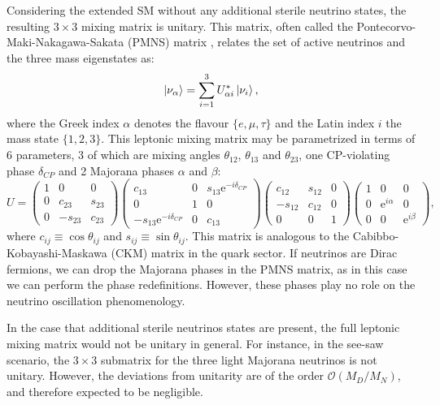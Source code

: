 Considering the extended SM without any additional sterile neutrino states, the  resulting $3 \times 3$ mixing matrix is unitary. This matrix, often called the Pontecorvo-Maki-Nakagawa-Sakata (PMNS) matrix \cite{Pontecorvo1957, Maki1962}, relates the set of active neutrinos and the three mass eigenstates as:
\begin{equation}\label{2.1}
\ket{\nu_{\alpha}} = \sum_{i=1}^{3} U^{*}_{\alpha i} \ket{\nu_{i}},
\end{equation}
where the Greek index $\alpha$ denotes the flavour $\{e,\mu,\tau\}$ and the Latin index $i$ the mass state $\{1,2,3\}$. This leptonic mixing matrix may be parametrized in terms of 6 parameters, 3 of which are mixing angles $\theta_{12}$, $\theta_{13}$ and $\theta_{23}$, one CP-violating phase $\delta_{CP}$ and 2 Majorana phases $\alpha$ and $\beta$:
\begin{equation}\label{2.2}
	U = \begin{pmatrix}1&0&0\\0&c_{23}&s_{23}\\0&-s_{23}&c_{23}\end{pmatrix} \begin{pmatrix}c_{13}&0&s_{13} \mathrm{e}^{-i\delta_{CP}}\\0&1&0\\-s_{13} \mathrm{e}^{-i\delta_{CP}}&0&c_{13}\end{pmatrix} \begin{pmatrix}c_{12}&s_{12}&0\\-s_{12}&c_{12}&0\\0&0&1\end{pmatrix} \begin{pmatrix}1&0&0\\0&\mathrm{e}^{i\alpha}&0\\0&0&\mathrm{e}^{i\beta}\end{pmatrix},
\end{equation}
where $c_{ij} \equiv \cos \theta_{ij}$ and $s_{ij} \equiv \sin \theta_{ij}$. This matrix is analogous to the Cabibbo-Kobayashi-Maskawa (CKM) matrix in the quark sector. If neutrinos are Dirac fermions, we can drop the Majorana phases in the PMNS matrix, as in this case we can perform the phase redefinitions. However, these phases play no role on the neutrino oscillation phenomenology.

In the case that additional sterile neutrinos states are present, the full leptonic mixing matrix would not be unitary in general. For instance, in the see-saw scenario, the $3 \times 3$ submatrix for the three light Majorana neutrinos is not unitary. However, the deviations from unitarity are of the order $\mathcal{O}(M_{D}/M_{N})$, and therefore expected to be negligible.

